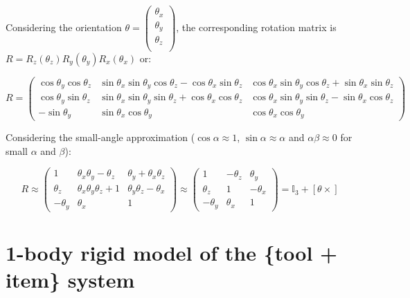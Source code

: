 \documentclass[\main/main.tex]{subfiles}
\begin{document}
Considering the orientation $\theta =
\begin{pmatrix}
 \theta_x \\
 \theta_y \\
 \theta_z \\
\end{pmatrix}
$,
the corresponding rotation matrix is $R = R_z(\theta_z)R_y(\theta_y)R_x(\theta_x)$ or:

\begin{equation*}
 R =
 \begin{pmatrix}
  \cos \theta_y \cos \theta_z & \sin \theta_x \sin \theta_y \cos \theta_z - \cos \theta_x \sin \theta_z & \cos \theta_x \sin \theta_y \cos \theta_z + \sin \theta_x \sin \theta_z \\
  \cos \theta_y \sin \theta_z & \sin \theta_x \sin \theta_y \sin \theta_z + \cos \theta_x \cos \theta_z & \cos \theta_x \sin \theta_y \sin \theta_z - \sin \theta_x \cos \theta_z \\
  - \sin \theta_y             & \sin \theta_x \cos \theta_y                                             & \cos \theta_x \cos \theta_y
 \end{pmatrix}
\end{equation*}

Considering the small-angle approximation ($\cos \alpha \approx 1$, $\sin \alpha \approx \alpha$ and $\alpha \beta \approx 0$ for small $\alpha$ and $\beta$):

\begin{equation}
 R \approx
 \begin{pmatrix}
  1         & \theta_x \theta_y -\theta_z    & \theta_y + \theta_x \theta_z \\
  \theta_z  & \theta_x \theta_y \theta_z + 1 & \theta_y \theta_z -\theta_x  \\
  -\theta_y & \theta_x                       & 1
 \end{pmatrix}
 \approx
 \begin{pmatrix}
  1         & -\theta_z & \theta_y  \\
  \theta_z  & 1         & -\theta_x \\
  -\theta_y & \theta_x  & 1
 \end{pmatrix}
 = \mathbb{I}_3 + \left[ \theta \times \right]
\end{equation}

\newpage

\section{1-body rigid model of the \{tool + item\} system}
\label{appendix:rigid}
\end{document}

